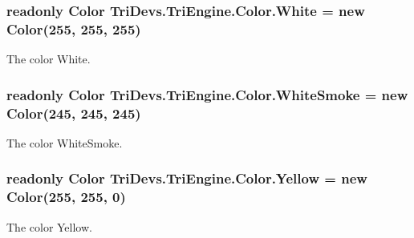\hypertarget{struct_tri_devs_1_1_tri_engine_1_1_color_a661143d6db96a873fb04892f3624c2b4}{
\subsubsection[{White}]{\setlength{\rightskip}{0pt plus 5cm}readonly {\bf Color} Tri\-Devs.\-Tri\-Engine.\-Color.\-White = new {\bf Color}(255, 255, 255)\hspace{0.3cm}{\ttfamily [static]}}}\label{struct_tri_devs_1_1_tri_engine_1_1_color_a661143d6db96a873fb04892f3624c2b4}


The color White. 

\hypertarget{struct_tri_devs_1_1_tri_engine_1_1_color_a80adde12a126efee5ec479f39e8329ed}{
\subsubsection[{White\-Smoke}]{\setlength{\rightskip}{0pt plus 5cm}readonly {\bf Color} Tri\-Devs.\-Tri\-Engine.\-Color.\-White\-Smoke = new {\bf Color}(245, 245, 245)\hspace{0.3cm}{\ttfamily [static]}}}\label{struct_tri_devs_1_1_tri_engine_1_1_color_a80adde12a126efee5ec479f39e8329ed}


The color White\-Smoke. 

\hypertarget{struct_tri_devs_1_1_tri_engine_1_1_color_a122075dc859f3eb94a8b875a04d64113}{
\subsubsection[{Yellow}]{\setlength{\rightskip}{0pt plus 5cm}readonly {\bf Color} Tri\-Devs.\-Tri\-Engine.\-Color.\-Yellow = new {\bf Color}(255, 255, 0)\hspace{0.3cm}{\ttfamily [static]}}}\label{struct_tri_devs_1_1_tri_engine_1_1_color_a122075dc859f3eb94a8b875a04d64113}


The color Yellow. 

